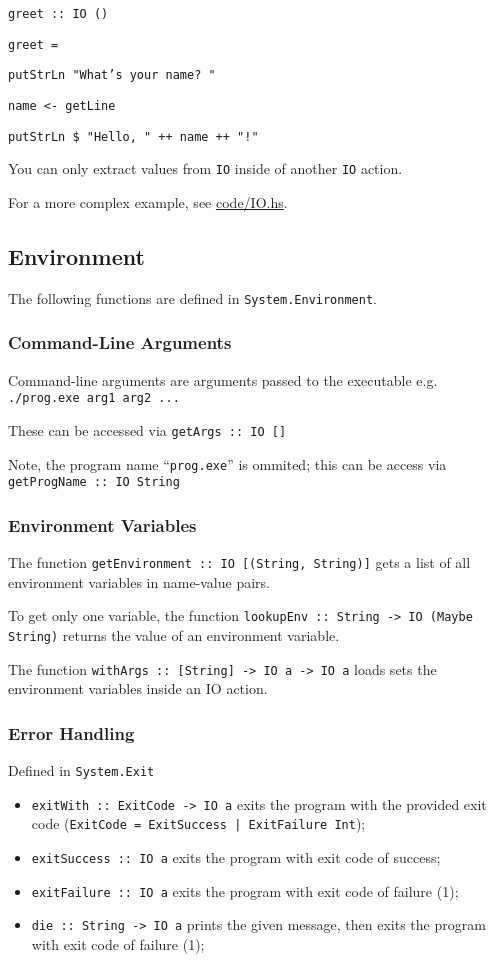 \texttt{greet :: IO ()}

\texttt{greet = }

\quad\texttt{putStrLn "What's your name? "}

\quad\texttt{name <- getLine}

\quad\texttt{putStrLn \$ "Hello, " ++ name ++ "!"}

You can only extract values from \texttt{IO} inside of another \texttt{IO} action.

For a more complex example, see \url{code/IO.hs}.

\subsection{Environment}
The following functions are defined in \texttt{System.Environment}.

\subsubsection{Command-Line Arguments}
Command-line arguments are arguments passed to the executable e.g. \texttt{./prog.exe arg1 arg2 ...}

These can be accessed via \texttt{getArgs :: IO []}

Note, the program name ``\texttt{prog.exe}'' is ommited; this can be access via \texttt{getProgName :: IO String}

\subsubsection{Environment Variables}
The function \texttt{getEnvironment :: IO [(String, String)]} gets a list of all environment variables in name-value pairs.

To get only one variable, the function \texttt{lookupEnv :: String -> IO (Maybe String)} returns the value of an environment variable.

The function \texttt{withArgs :: [String] -> IO a -> IO a} loads sets the environment variables inside an IO action.

\subsubsection{Error Handling}
Defined in \texttt{System.Exit}

\begin{itemize}
  \item \texttt{exitWith :: ExitCode -> IO a} exits the program with the provided exit code (\texttt{ExitCode = ExitSuccess | ExitFailure Int});
  \item \texttt{exitSuccess :: IO a} exits the program with exit code of success;
  \item \texttt{exitFailure :: IO a} exits the program with exit code of failure (1);
  \item \texttt{die :: String -> IO a} prints the given message, then exits the program with exit code of failure (1);
\end{itemize}